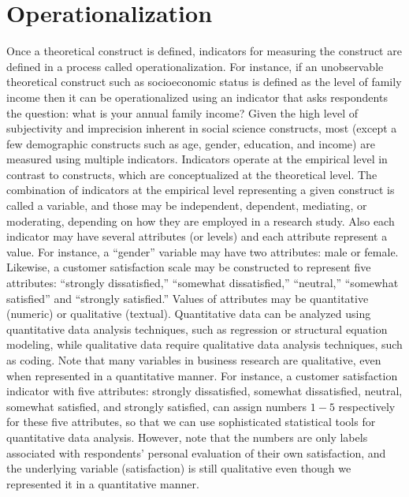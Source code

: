 \section{Operationalization}

Once a theoretical construct is defined, indicators for measuring the construct are defined in a process called operationalization. For instance, if an unobservable theoretical construct such as socioeconomic status is defined as the level of family income then it can be operationalized using an indicator that asks respondents the question: what is your annual family income? Given the high level of subjectivity and imprecision inherent in social science constructs, most (except a few demographic constructs such as age, gender, education, and income) are measured using multiple indicators.
Indicators operate at the empirical level in contrast to constructs, which are conceptualized at the theoretical level. The combination of indicators at the empirical level representing a given construct is called a variable, and those may be independent, dependent, mediating, or moderating, depending on how they are employed in a research study. Also each indicator may have several attributes (or levels) and each attribute represent a value. For instance, a ``gender'' variable may have two attributes: male or female. Likewise, a customer satisfaction scale may be constructed to represent five attributes: ``strongly dissatisfied,'' ``somewhat dissatisfied,'' ``neutral,'' ``somewhat satisfied'' and ``strongly satisfied.'' Values of attributes may be quantitative (numeric) or qualitative (textual). Quantitative data can be analyzed using quantitative data analysis techniques, such as regression or structural equation modeling, while qualitative data require qualitative data analysis techniques, such as coding. Note that many variables in business research are qualitative, even when represented in a quantitative manner. For instance, a customer satisfaction indicator with five attributes: strongly dissatisfied, somewhat dissatisfied, neutral, somewhat satisfied, and strongly satisfied, can assign numbers $ 1-5 $ respectively for these five attributes, so that we can use sophisticated statistical tools for quantitative data analysis. However, note that the numbers are only labels associated with respondents' personal evaluation of their own satisfaction, and the underlying variable (satisfaction) is still qualitative even though we represented it in a quantitative manner.

